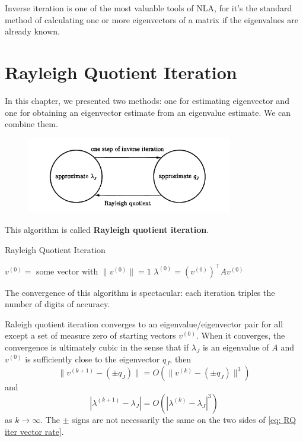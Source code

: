 Inverse iteration is one of the most valuable tools of NLA, for it's the standard method of calculating one or more eigenvectors of a matrix if the eigenvalues are already known.  

\section{Rayleigh Quotient Iteration} 
In this chapter, we presented two methods: one for estimating eigenvector and one for obtaining an eigenvector estimate from an eigenvalue estimate. We can combine them. 
\begin{figure}[H]
    \centering
    \includegraphics[width=0.8\textwidth]{figures/27-2.png}
\end{figure}

This algorithm is called \textbf{Rayleigh quotient iteration}. 

\begin{algorithm}[H]
    \caption{Rayleigh Quotient Iteration}
    \label{Algo 27.3}
    $ v^{(0)}= $ some vector with $ \|v^{(0)}\|=1 $\; 
    $ \lambda ^{(0)} = (v^{(0)})^\top  A v^{(0)} $\;
\end{algorithm}

The convergence of this algorithm is spectacular: each iteration triples the number of digits of accuracy. 


\begin{theorem}
\label{thm: convergence rayleigh quotient}
Raleigh quotient iteration converges to an eigenvalue/eigenvector pair for all except a set of measure zero of starting vectors $v^{(0)}$. When it converges, the convergence is ultimately cubic in the sense that if $\lambda _J$ is an eigenvalue of $A$ and $v^{(0)}$ is sufficiently close to the eigenvector $q_J$, then 
\begin{equation}
\label{eq: RQ iter vector rate}
    \|v ^{(k+1)} - (\pm q_J)\| = O(\|v^{(k)} - (\pm q_J)\|^3) 
\end{equation}
and 
\begin{equation}
\label{eq: RQ iter value rate}
    |\lambda ^{(k+1)}-\lambda _J| = O(|\lambda ^{(k)}- \lambda _J|^3)
\end{equation}
as $k\to \infty$. The $ \pm $ signs are not necessarily the same on the two sides of \eqref{eq: RQ iter vector rate}. 
\end{theorem}

